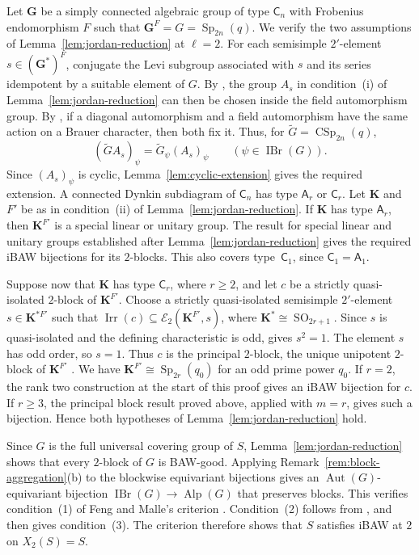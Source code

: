 \documentclass[10pt]{amsart}
\theoremstyle{definition}
\renewcommand{\geq}{\geqslant}
\let\oldendproof\endproof
\renewenvironment{proof}[1][\proofname]{%
  \oldproof[\bfseries #1]%
}{\oldendproof}
\DeclareMathOperator{\Aut}{Aut}
\DeclareMathOperator{\IBr}{IBr}
\DeclareMathOperator{\Irr}{Irr}
\DeclareMathOperator{\Alp}{Alp}
\DeclareMathOperator{\Sp}{Sp}
\DeclareMathOperator{\CSp}{CSp}
\numberwithin{equation}{section}
\numberwithin{table}{section}
\begin{document}
\begin{proof}
Let $\mathbf G$ be a simply connected algebraic group of type $\mathsf C_n$
with Frobenius endomorphism $F$ such that
$\mathbf G^F=G=\Sp_{2n}(q)$.  We verify the two assumptions of
Lemma~\ref{lem:jordan-reduction} at $\ell=2$.
For each semisimple $2'$-element $s\in(\mathbf G^*)^F$, conjugate the Levi
subgroup associated with $s$ and its series idempotent by a suitable element
of $G$. By \cite[Corollary~4.2 and Lemmas~4.3 and~4.5]{Ruhstorfer2022Derived},
the group $A_s$ in condition~\textup{(i)} of Lemma~\ref{lem:jordan-reduction}
can then be chosen inside the field automorphism group. By \cite[Corollary~4.6]{FengMalle2022}, if a diagonal
automorphism and a field automorphism have the same action on a Brauer
character, then both fix it. Thus, for $\widetilde G=\CSp_{2n}(q)$,
\[
 (\widetilde G A_s)_\psi=\widetilde G_\psi(A_s)_\psi
 \qquad(\psi\in\IBr(G)).
\]
Since $(A_s)_\psi$ is cyclic, Lemma~\ref{lem:cyclic-extension} gives
the required extension.
A connected Dynkin subdiagram of
$\mathsf C_n$ has type $\mathsf A_r$ or $\mathsf C_r$.
Let $\mathbf K$ and $F'$ be as in condition~\textup{(ii)} of
Lemma~\ref{lem:jordan-reduction}. If $\mathbf K$ has type $\mathsf A_r$,
then $\mathbf K^{F'}$ is a special linear or unitary group.
The result for special linear and unitary groups established after
Lemma~\ref{lem:jordan-reduction} gives the required iBAW bijections
for its $2$-blocks.
This also covers type~$\mathsf C_1$, since $\mathsf C_1=\mathsf A_1$.

Suppose now that $\mathbf K$ has type $\mathsf C_r$, where $r\geq2$,
and let $c$ be a strictly quasi-isolated $2$-block of $\mathbf K^{F'}$.  Choose a strictly
quasi-isolated semisimple $2'$-element $s\in\mathbf K^{*F'}$ such that
$\Irr(c)\subseteq\mathcal E_2(\mathbf K^{F'},s)$, where
$\mathbf K^*\cong\operatorname{SO}_{2r+1}$.
Since $s$ is quasi-isolated and the defining characteristic is odd,
\cite[Proposition~4.11(a)]{Bonnafe2005} gives $s^2=1$.  The element $s$
has odd order, so $s=1$.  Thus $c$ is the principal $2$-block, the unique
unipotent $2$-block of $\mathbf K^{F'}$
\cite[Theorem~21.14]{CabanesEnguehard2004}.  We have $\mathbf K^{F'}\cong\Sp_{2r}(q_0)$ for an odd prime
power $q_0$. If $r=2$, the rank two construction at the start
of this proof gives an iBAW bijection for $c$.
If $r\geq3$, the principal block result proved above, applied
with $m=r$, gives such a bijection.
Hence both hypotheses of Lemma~\ref{lem:jordan-reduction} hold.

Since $G$ is the full universal covering group of $S$,
Lemma~\ref{lem:jordan-reduction} shows that every $2$-block of $G$ is
BAW-good. Applying Remark~\ref{rem:block-aggregation}\textup{(b)} to the blockwise
equivariant bijections gives an $\Aut(G)$-equivariant
bijection $\IBr(G)\longrightarrow\Alp(G)$ that preserves blocks.
This verifies condition~\textup{(1)} of Feng and Malle's criterion
\cite[Proposition~3.4]{FengMalle2022}.  Condition~\textup{(2)} follows
from \cite[Corollary~4.6]{FengMalle2022}, and
\cite[Remark~3.5]{FengMalle2022} then gives condition~\textup{(3)}.
The criterion therefore shows that $S$ satisfies iBAW at $2$ on
$X_2(S)=S$.
\end{proof}
\end{document}
